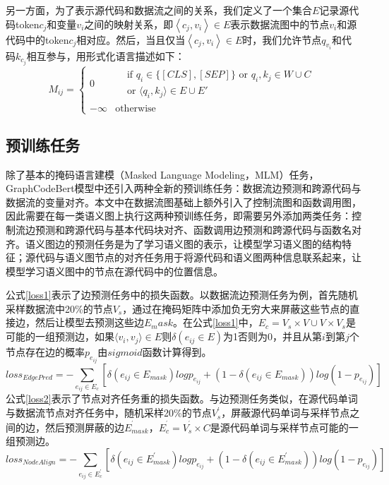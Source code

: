 另一方面，为了表示源代码和数据流之间的关系，我们定义了一个集合$E$记录源代码token$c_j$和变量$v_i$之间的映射关系，即$\left\langle c_j,v_i \right\rangle \in E$表示数据流图中的节点$v_i$和源代码中的token$c_j$相对应。然后，当且仅当$\left\langle c_j,v_i \right\rangle \in E$时，我们允许节点$q_{v_i}$和代码$k_{c_j}$相互参与，用形式化语言描述如下：
\begin{equation}
    M_{ij} =
    \begin{cases}
        0 & \begin{aligned}
               &\text{if } q_i \in \{[CLS], [SEP]\} \text{ or } q_i, k_j \in W \cup C \\
               &\text{or } \langle q_i, k_j \rangle \in E \cup E'
           \end{aligned} \\
        -\infty & \text{otherwise}
    \end{cases}
    \label{eq:mask}
\end{equation}

\subsection{预训练任务}
\label{sec:预训练任务}
除了基本的掩码语言建模（Masked Language Modeling，MLM）任务\cite{devlin2018bert}，GraphCodeBert模型中还引入两种全新的预训练任务：数据流边预测和跨源代码与数据流的变量对齐。本文中在数据流图基础上额外引入了控制流图和函数调用图，因此需要在每一类语义图上执行这两种预训练任务，即需要另外添加两类任务：控制流边预测和跨源代码与基本代码块对齐、函数调用边预测和跨源代码与函数名对齐。语义图边的预测任务是为了学习语义图的表示，让模型学习语义图的结构特征；源代码与语义图节点的对齐任务用于将源代码和语义图两种信息联系起来，让模型学习语义图中的节点在源代码中的位置信息。

公式\eqref{loss1}表示了边预测任务中的损失函数。以数据流边预测任务为例，首先随机采样数据流中20\%的节点$V_s$，通过在掩码矩阵中添加负无穷大来屏蔽这些节点的直接边，然后让模型去预测这些边$E_mask$。在公式\eqref{loss1}中，$E_c=V_s\times V\cup V\times V_s$是可能的一组预测边，如果$\langle v_i,v_j\rangle\in E$则$\delta(e_{ij}\in E)$为1否则为0，并且从第$i$到第$j$个节点存在边的概率$p_{e_{ij}}$由$sigmoid$函数计算得到。
\begin{equation}
loss_{EdgePred}=-\sum_{e_{ij}\in E_{c}}[\delta(e_{ij}\in E_{mask})logp_{e_{ij}}+(1-\delta(e_{ij}\in E_{mask}))log(1-p_{e_{ij}})] \label{loss1}
\end{equation}
公式\eqref{loss2}表示了节点对齐任务重的损失函数。与边预测任务类似，在源代码单词与数据流节点对齐任务中，随机采样20\%的节点$V_{s}^{'}$，屏蔽源代码单词与采样节点之间的边，然后预测屏蔽的边$E_{mask}^{^{\prime}}$，$E_c^{^{\prime}}=V_s^{^{\prime}}\times C$是源代码单词与采样节点可能的一组预测边。
\begin{equation}
loss_{NodeAlign}=-\sum_{e_{ij}\in E_{c}^{'}}[\delta(e_{ij}\in E_{mask}^{'})logp_{e_{ij}}+(1-\delta(e_{ij}\in E_{mask}^{'}))log(1-p_{e_{ij}})] \label{loss2}
\end{equation}

